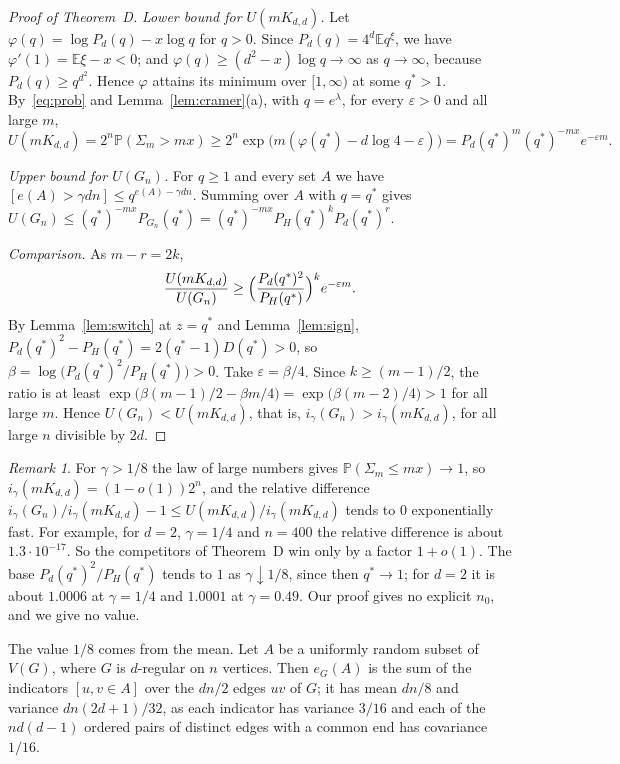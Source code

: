 \documentclass[11pt]{article}
\theoremstyle{remark}
\newtheorem{remark}[theorem]{Remark}
\newcommand{\Prb}{\mathbb P}
\newcommand{\Ex}{\mathbb E}
\begin{document}
\begin{proof}[Proof of Theorem~D]
\emph{Lower bound for $U(mK_{d,d})$.} Let $\varphi(q)=\log P_d(q)-x\log q$
for $q>0$. Since $P_d(q)=4^d\Ex q^\xi$, we have $\varphi'(1)=\Ex\xi-x<0$;
and $\varphi(q)\ge(d^2-x)\log q\to\infty$ as $q\to\infty$, because
$P_d(q)\ge q^{d^2}$. Hence $\varphi$ attains its minimum over $[1,\infty)$ at
some $q^*>1$. By~\eqref{eq:prob} and Lemma~\ref{lem:cramer}(a), with
$q=e^\lambda$, for every $\varepsilon>0$ and all large $m$,
\[
 U(mK_{d,d})=2^n\Prb(\Sigma_m>mx)\ge2^n\exp\bigl(m(\varphi(q^*)-d\log4-\varepsilon)
 \bigr)=P_d(q^*)^m(q^*)^{-mx}e^{-\varepsilon m}.
\]

\emph{Upper bound for $U(G_n)$.} For $q\ge1$ and every set $A$ we have
$[e(A)>\gamma dn]\le q^{e(A)-\gamma dn}$. Summing over $A$ with $q=q^*$ gives
$U(G_n)\le(q^*)^{-mx}P_{G_n}(q^*)=(q^*)^{-mx}P_H(q^*)^kP_d(q^*)^r$.

\emph{Comparison.} As $m-r=2k$,
\[
 \frac{U(mK_{d,d})}{U(G_n)}\ge
 \Bigl(\frac{P_d(q^*)^2}{P_H(q^*)}\Bigr)^ke^{-\varepsilon m}.
\]
By Lemma~\ref{lem:switch} at $z=q^*$ and Lemma~\ref{lem:sign},
$P_d(q^*)^2-P_H(q^*)=2(q^*-1)D(q^*)>0$, so
$\beta=\log\bigl(P_d(q^*)^2/P_H(q^*)\bigr)>0$. Take $\varepsilon=\beta/4$.
Since $k\ge(m-1)/2$, the ratio is at least
$\exp\bigl(\beta(m-1)/2-\beta m/4\bigr)=\exp\bigl(\beta(m-2)/4\bigr)>1$ for all
large $m$. Hence $U(G_n)<U(mK_{d,d})$, that is,
$i_\gamma(G_n)>i_\gamma(mK_{d,d})$, for all large $n$ divisible by $2d$.
\end{proof}

\begin{remark}\label{rem:size}
For $\gamma>1/8$ the law of large numbers gives $\Prb(\Sigma_m\le mx)\to1$, so
$i_\gamma(mK_{d,d})=(1-o(1))2^n$, and the relative difference
$i_\gamma(G_n)/i_\gamma(mK_{d,d})-1\le U(mK_{d,d})/i_\gamma(mK_{d,d})$ tends to
$0$ exponentially fast. For example, for $d=2$, $\gamma=1/4$ and $n=400$ the
relative difference is about $1.3\cdot10^{-17}$. So the competitors of
Theorem~D win only by a factor $1+o(1)$. The base
$P_d(q^*)^2/P_H(q^*)$ tends to $1$ as $\gamma\downarrow1/8$, since then
$q^*\to1$; for $d=2$ it is about $1.0006$ at $\gamma=1/4$ and $1.0001$ at
$\gamma=0.49$. Our proof gives no explicit $n_0$, and we give no value.

The value $1/8$ comes from the mean. Let $A$ be a uniformly random subset of
$V(G)$, where $G$ is $d$-regular on $n$ vertices. Then $e_G(A)$ is the sum of
the indicators $[u,v\in A]$ over the $dn/2$ edges $uv$ of $G$; it has mean
$dn/8$ and variance $dn(2d+1)/32$, as each indicator has variance $3/16$ and
each of the $nd(d-1)$ ordered pairs of distinct edges with a common end has
covariance $1/16$.
\end{remark}
\end{document}
